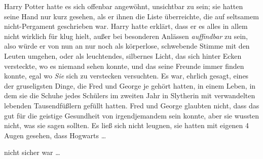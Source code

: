 \later

Harry Potter hatte es sich offenbar angewöhnt, unsichtbar zu sein; sie hatten seine Hand nur kurz gesehen, als er ihnen die Liste überreichte, die auf seltsamem nicht-Pergament geschrieben war. Harry hatte erklärt, dass er es alles in allem nicht wirklich für klug hielt, außer bei besonderen Anlässen \emph{auffindbar} zu sein, also würde er von nun an nur noch als körperlose, schwebende Stimme mit den Leuten umgehen, oder als leuchtendes, silbernes Licht, das sich hinter Ecken versteckte, wo es niemand sehen konnte, und das seine Freunde immer finden konnte, egal wo \emph{Sie} sich zu verstecken versuchten. Es war, ehrlich gesagt, eines der gruseligsten Dinge, die Fred und George je gehört hatten, in einem Leben, in dem sie die Schuhe jedes Schülers im zweiten Jahr in Slytherin mit verwandelten lebenden Tausendfüßlern gefüllt hatten. Fred und George glaubten nicht, dass das gut für die geistige Gesundheit von irgendjemandem sein konnte, aber sie wussten nicht, was sie sagen sollten. Es ließ sich nicht leugnen, sie hatten mit eigenen 4 Augen gesehen, dass Hogwarts …

nicht sicher war …

